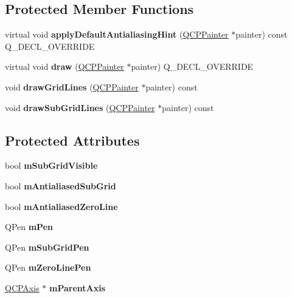 \subsection*{Protected Member Functions}
\begin{DoxyCompactItemize}
\item 
\mbox{\label{classQCPGrid_a64fa48e16b4629f5df2a5029ab6e761c}} 
virtual void {\bfseries apply\+Default\+Antialiasing\+Hint} (\hyperlink{classQCPPainter}{Q\+C\+P\+Painter} $\ast$painter) const Q\+\_\+\+D\+E\+C\+L\+\_\+\+O\+V\+E\+R\+R\+I\+DE
\item 
\mbox{\label{classQCPGrid_aad9a312d998e2d170956334d4cb80be2}} 
virtual void {\bfseries draw} (\hyperlink{classQCPPainter}{Q\+C\+P\+Painter} $\ast$painter) Q\+\_\+\+D\+E\+C\+L\+\_\+\+O\+V\+E\+R\+R\+I\+DE
\item 
\mbox{\label{classQCPGrid_aee4e95d54acabbe298d6dda0dd86c0a4}} 
void {\bfseries draw\+Grid\+Lines} (\hyperlink{classQCPPainter}{Q\+C\+P\+Painter} $\ast$painter) const
\item 
\mbox{\label{classQCPGrid_a751ce8aef815bcc9193432a30c8b6b6e}} 
void {\bfseries draw\+Sub\+Grid\+Lines} (\hyperlink{classQCPPainter}{Q\+C\+P\+Painter} $\ast$painter) const
\end{DoxyCompactItemize}
\subsection*{Protected Attributes}
\begin{DoxyCompactItemize}
\item 
\mbox{\label{classQCPGrid_a4e4a0400d6319bb44c06341f6298c87b}} 
bool {\bfseries m\+Sub\+Grid\+Visible}
\item 
\mbox{\label{classQCPGrid_a71b7051f833f0c5de3094998d6afdd87}} 
bool {\bfseries m\+Antialiased\+Sub\+Grid}
\item 
\mbox{\label{classQCPGrid_a8c0df56ae86440408c050895dcdb922b}} 
bool {\bfseries m\+Antialiased\+Zero\+Line}
\item 
\mbox{\label{classQCPGrid_a1cdc4a3bccf6a40c2d4360def9fefa40}} 
Q\+Pen {\bfseries m\+Pen}
\item 
\mbox{\label{classQCPGrid_aa9004bc139ad3ea92629f0aaae81d83f}} 
Q\+Pen {\bfseries m\+Sub\+Grid\+Pen}
\item 
\mbox{\label{classQCPGrid_a379481871f17655c27eda30af233554f}} 
Q\+Pen {\bfseries m\+Zero\+Line\+Pen}
\item 
\mbox{\label{classQCPGrid_a9a8a76731e6e737b65b929fd1995cc88}} 
\hyperlink{classQCPAxis}{Q\+C\+P\+Axis} $\ast$ {\bfseries m\+Parent\+Axis}
\end{DoxyCompactItemize}
